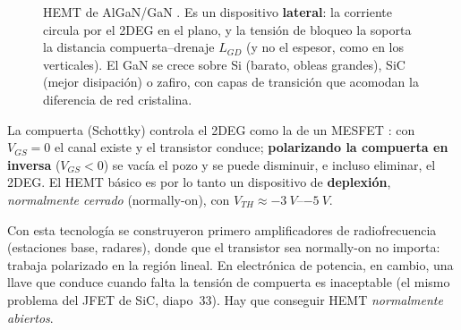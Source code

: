 \begin{figure}[H]
\centering
{}
\caption{HEMT de AlGaN/GaN . Es un dispositivo \textbf{lateral}: la corriente circula por el
2DEG en el plano, y la tensión de bloqueo la soporta la distancia compuerta--drenaje $L_{GD}$ (y no el
espesor, como en los verticales). El GaN se crece sobre Si (barato, obleas grandes), SiC (mejor
disipación) o zafiro, con capas de transición que acomodan la diferencia de red cristalina.}
\label{fig:hemt-estructura}
\end{figure}

La compuerta (Schottky) controla el 2DEG como la de un MESFET : con $V_{GS}=0$ el canal
existe y el transistor conduce; \textbf{polarizando la compuerta en inversa} ($V_{GS}<0$) se vacía el
pozo y se puede disminuir, e incluso eliminar, el 2DEG. El HEMT básico es por lo tanto un dispositivo
de \textbf{deplexión}, \emph{normalmente cerrado} (normally-on), con $V_{TH}\approx\SIrange{-3}{-5}{V}$.

\begin{intuicion}
Con esta tecnología se construyeron primero amplificadores de radiofrecuencia (estaciones base,
radares), donde que el transistor sea normally-on no importa: trabaja polarizado en la región
lineal. En electrónica de potencia, en cambio, una llave que conduce cuando falta la tensión de
compuerta es inaceptable (el mismo problema del JFET de SiC, diapo~33). Hay que conseguir HEMT
\emph{normalmente abiertos}.
\end{intuicion}

